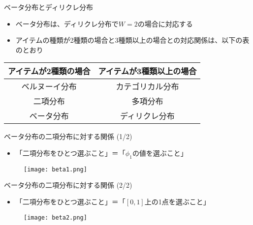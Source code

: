 \documentclass[aspectratio=169,unicode,dvipdfmx,14pt]{beamer}
\begin{document}
\begin{frame}{ベータ分布とディリクレ分布}
\begin{itemize}
\item ベータ分布は、ディリクレ分布で$W=2$の場合に対応する
\item アイテムの種類が2種類の場合と3種類以上の場合との対応関係は、以下の表のとおり
\end{itemize}
\begin{table}
\begin{center}
\begin{tabular}{|c|c|}
\hline アイテムが2種類の場合 & アイテムが3種類以上の場合 \\ \hline
ベルヌーイ分布 & カテゴリカル分布 \\
二項分布 & 多項分布 \\
ベータ分布 & ディリクレ分布 \\ \hline
\end{tabular}
\end{center}
\end{table}
\end{frame}

\begin{frame}{ベータ分布の二項分布に対する関係 (1/2)}
\begin{itemize}
\item 「二項分布をひとつ選ぶこと」＝「$\phi_1$の値を選ぶこと」
\end{itemize}
\begin{figure}[t]
\begin{center}
\texttt{[image: beta1.png]}
\end{center}
\end{figure}
\end{frame}

\begin{frame}{ベータ分布の二項分布に対する関係 (2/2)}
\begin{itemize}
\item 「二項分布をひとつ選ぶこと」＝「$[0,1]$上の1点を選ぶこと」
\end{itemize}
\begin{figure}[t]
\begin{center}
\texttt{[image: beta2.png]}
\end{center}
\end{figure}
\end{frame}
\end{document}
